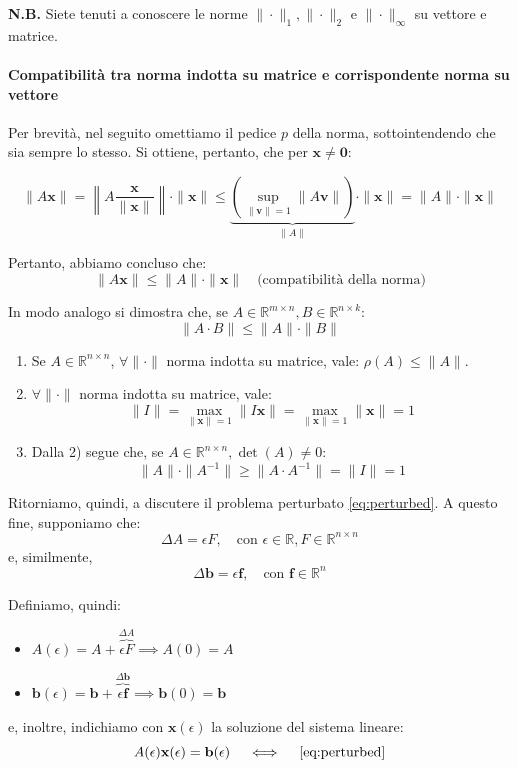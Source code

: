 \textbf{N.B.} Siete tenuti a conoscere le norme $\| \cdot \|_1, \| \cdot \|_2$ e $\| \cdot \|_\infty$ su vettore e matrice.

\paragraph{Compatibilità tra norma indotta su matrice e corrispondente norma su vettore}
Per brevità, nel seguito omettiamo il pedice $p$ della norma, sottointendendo che sia sempre lo stesso.
Si ottiene, pertanto, che per $\mathbf{x} \neq \mathbf{0}$:

$$ \| A \mathbf{x} \| = \left\| A \frac{\mathbf{x}}{\| \mathbf{x} \|} \right\| \cdot \| \mathbf{x} \| \le \underbrace{\left( \sup_{\| \mathbf{v} \| = 1} \| A \mathbf{v} \| \right)}_{\| A \|} \cdot \| \mathbf{x} \| = \| A \| \cdot \| \mathbf{x} \| $$

Pertanto, abbiamo concluso che:
$$ \| A \mathbf{x} \| \le \| A \| \cdot \| \mathbf{x} \| \quad \text{(compatibilità della norma)} $$

In modo analogo si dimostra che, se $A \in \mathbb{R}^{m \times n}, B \in \mathbb{R}^{n \times k}$:
$$ \| A \cdot B \| \le \| A \| \cdot \| B \| $$

\begin{osservazione}
\begin{enumerate}
    \item Se $A \in \mathbb{R}^{n \times n}$, $\forall \| \cdot \|$ norma indotta su matrice, vale: $\rho(A) \le \| A \|$.
    \item $\forall \| \cdot \|$ norma indotta su matrice, vale:
    $$ \| I \| = \max_{\|\mathbf{x}\|=1} \| I \mathbf{x} \| = \max_{\|\mathbf{x}\|=1} \| \mathbf{x} \| = 1 $$
    \item Dalla 2) segue che, se $A \in \mathbb{R}^{n \times n}, \det(A) \neq 0$:
    $$ \| A \| \cdot \| A^{-1} \| \ge \| A \cdot A^{-1} \| = \| I \| = 1 $$
\end{enumerate}
\end{osservazione}

Ritorniamo, quindi, a discutere il problema perturbato \eqref{eq:perturbed}. A questo fine, supponiamo che:
$$ \Delta A = \epsilon F, \quad \text{con } \epsilon \in \mathbb{R}, F \in \mathbb{R}^{n \times n} $$
e, similmente,
$$ \Delta \mathbf{b} = \epsilon \mathbf{f}, \quad \text{con } \mathbf{f} \in \mathbb{R}^n $$

Definiamo, quindi:
\begin{itemize}
    \item $A(\epsilon) = A + \overbrace{\epsilon F}^{\Delta A} \implies A(0) = A$
    \item $\mathbf{b}(\epsilon) = \mathbf{b} + \overbrace{\epsilon \mathbf{f}}^{\Delta \mathbf{b}} \implies \mathbf{b}(0) = \mathbf{b}$
\end{itemize}
e, inoltre, indichiamo con $\mathbf{x}(\epsilon)$ la soluzione del sistema lineare:
\begin{equation} \label{eq:perturbed_param}
    A(\epsilon) \mathbf{x}(\epsilon) = \mathbf{b}(\epsilon) \quad \iff \quad \eqref{eq:perturbed}
\end{equation}

